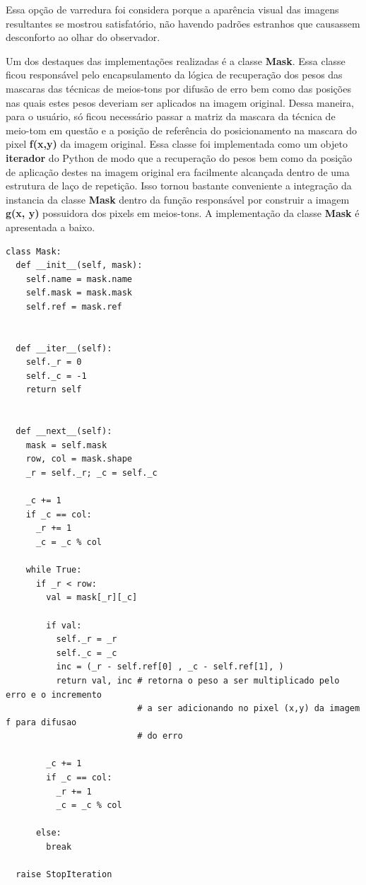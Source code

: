\documentclass{article}
\begin{document}
Essa opção de varredura foi considera porque a aparência visual das imagens resultantes se mostrou satisfatório, não havendo padrões estranhos que causassem desconforto ao olhar do observador.

Um dos destaques das implementações realizadas é a classe \textbf{Mask}. Essa classe ficou responsável pelo encapsulamento da lógica de recuperação dos pesos das mascaras das técnicas de meios-tons por difusão de erro bem como das posições nas quais estes pesos deveriam ser aplicados na imagem original. Dessa maneira, para o usuário, só ficou necessário passar a matriz da mascara da técnica de meio-tom em questão e a posição de referência do posicionamento na mascara do pixel \textbf{f(x,y)} da imagem original. Essa classe foi implementada como um objeto \textbf{iterador} do Python de modo que a recuperação do pesos bem como da posição de aplicação destes na imagem original era facilmente alcançada dentro de uma estrutura de laço de repetição. Isso tornou bastante conveniente a integração da instancia da classe \textbf{Mask} dentro da função responsável por construir a imagem \textbf{g(x, y)} possuidora dos pixels em meios-tons. A implementação da classe \textbf{Mask} é apresentada a baixo.

\begin{lstlisting}
class Mask:
  def __init__(self, mask):
    self.name = mask.name
    self.mask = mask.mask
    self.ref = mask.ref


  def __iter__(self):
    self._r = 0
    self._c = -1 
    return self


  def __next__(self):
    mask = self.mask
    row, col = mask.shape
    _r = self._r; _c = self._c

    _c += 1
    if _c == col:
      _r += 1 
      _c = _c % col

    while True:
      if _r < row:
        val = mask[_r][_c]

        if val:
          self._r = _r
          self._c = _c
          inc = (_r - self.ref[0] , _c - self.ref[1], )
          return val, inc # retorna o peso a ser multiplicado pelo erro e o incremento
                          # a ser adicionando no pixel (x,y) da imagem f para difusao
                          # do erro

        _c += 1
        if _c == col:
          _r += 1 
          _c = _c % col

      else:
        break

  raise StopIteration
\end{lstlisting}
\end{document}
